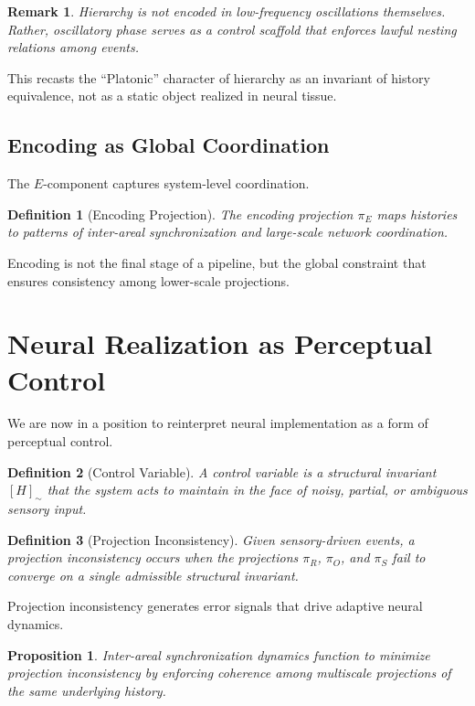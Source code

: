 \documentclass[11pt]{article}
\newtheorem{definition}{Definition}
\newtheorem{remark}{Remark}
\newtheorem{proposition}{Proposition}
\begin{document}
\begin{remark}
Hierarchy is not encoded in low-frequency oscillations themselves. Rather, oscillatory phase serves as a \emph{control scaffold} that enforces lawful nesting relations among events.
\end{remark}

This recasts the “Platonic” character of hierarchy as an invariant of history equivalence, not as a static object realized in neural tissue.

\subsection{Encoding as Global Coordination}

The $E$-component captures system-level coordination.

\begin{definition}[Encoding Projection]
The encoding projection $\pi_E$ maps histories to patterns of inter-areal synchronization and large-scale network coordination.
\end{definition}

Encoding is not the final stage of a pipeline, but the global constraint that ensures consistency among lower-scale projections.

\section{Neural Realization as Perceptual Control}

We are now in a position to reinterpret neural implementation as a form of perceptual control.

\begin{definition}[Control Variable]
A \emph{control variable} is a structural invariant $[H]_{\sim}$ that the system acts to maintain in the face of noisy, partial, or ambiguous sensory input.
\end{definition}

\begin{definition}[Projection Inconsistency]
Given sensory-driven events, a \emph{projection inconsistency} occurs when the projections $\pi_R$, $\pi_O$, and $\pi_S$ fail to converge on a single admissible structural invariant.
\end{definition}

Projection inconsistency generates error signals that drive adaptive neural dynamics.

\begin{proposition}
Inter-areal synchronization dynamics function to minimize projection inconsistency by enforcing coherence among multiscale projections of the same underlying history.
\end{proposition}
\end{document}
